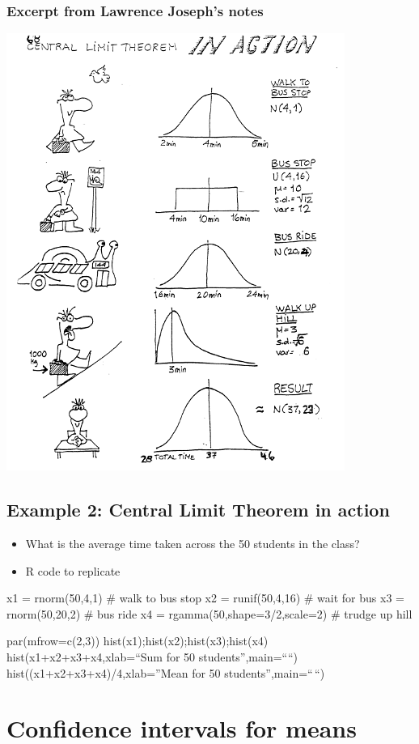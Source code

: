 \documentclass[
]{book}
\providecommand{\tightlist}{%
  \setlength{\itemsep}{0pt}\setlength{\parskip}{0pt}}
\begin{document}
\hypertarget{excerpt-from-lawrence-josephs-notes}{%
\subsubsection{Excerpt from Lawrence Joseph's notes}\label{excerpt-from-lawrence-josephs-notes}}

\includegraphics[width=0.5\linewidth]{./3_35}

\hypertarget{example-2-central-limit-theorem-in-action}{%
\subsection{Example 2: Central Limit Theorem in action}\label{example-2-central-limit-theorem-in-action}}

\begin{itemize}
\tightlist
\item
  What is the average time taken across the 50 students in the class?
\item
  R code to replicate
\end{itemize}

x1 = rnorm(50,4,1) \# walk to bus stop
x2 = runif(50,4,16) \# wait for bus
x3 = rnorm(50,20,2) \# bus ride
x4 = rgamma(50,shape=3/2,scale=2) \# trudge up hill

par(mfrow=c(2,3))
hist(x1);hist(x2);hist(x3);hist(x4)
hist(x1+x2+x3+x4,xlab=``Sum for 50 students'',main=````)
hist((x1+x2+x3+x4)/4,xlab=''Mean for 50 students'',main=``\,``)

\hypertarget{confidence-intervals-for-means}{%
\section{Confidence intervals for means}\label{confidence-intervals-for-means}}
\end{document}

